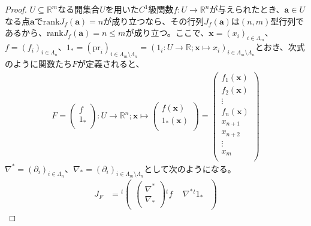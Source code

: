 \documentclass[dvipdfmx]{jsarticle}
\begin{document}
\begin{proof}
$U \subseteq \mathbb{R}^{m}$なる開集合$U$を用いた$C^{1}$級関数$f:U \rightarrow \mathbb{R}^{n}$が与えられたとき、$\mathbf{a} \in U$なる点$\mathbf{a}$で$\mathrm{rank}J_{f}\left( \mathbf{a} \right) = n$が成り立つなら、その行列$J_{f}\left( \mathbf{a} \right)$は$(n,m)$型行列であるから、$\mathrm{rank}J_{f}\left( \mathbf{a} \right) = n \leq m$が成り立つ。ここで、$\mathbf{x} = \left( x_{i} \right)_{i \in \varLambda_{m}}$、$f = \left( f_{i} \right)_{i \in \varLambda_{n}}$、$1_{*} = \left( \mathrm{pr}_{i} \right)_{i \in \varLambda_{m} \setminus \varLambda_{n} }= \left( 1_{i}:U \rightarrow \mathbb{R} ;\mathbf{x} \mapsto x_{i} \right)_{i \in \varLambda_{m} \setminus \varLambda_{n} }$とおき、次式のように関数たち$F$が定義されると、
\begin{align*}
F=\begin{pmatrix} f \\ 1_{*} \\ \end{pmatrix} :U \rightarrow \mathbb{R}^{n};\mathbf{x} \mapsto \begin{pmatrix}
f\left( \mathbf{x} \right) \\
1_{*} \left( \mathbf{x} \right) \\
\end{pmatrix} = \begin{pmatrix}
f_{1}\left( \mathbf{x} \right) \\
f_{2}\left( \mathbf{x} \right) \\
 \vdots \\
f_{n}\left( \mathbf{x} \right) \\
x_{n + 1} \\
x_{n + 2} \\
 \vdots \\
x_{m} \\
\end{pmatrix}
\end{align*}
$\nabla^{*} =\left( \partial_{i} \right)_{i\in \varLambda_{n} } $、$\nabla_{*} =\left( \partial_{i} \right)_{i\in \varLambda_{m} \setminus \varLambda_{n} } $として次のようになる。
\begin{align*}
J_{F} &= {}^{t} \begin{pmatrix}
 \begin{pmatrix}
  \nabla^{*} \\
  \nabla_{*} \\
 \end{pmatrix} {}^{t}f & \begin{matrix}
  \nabla^{*} {}^{t} 1_{*} \\

\end{matrix}
\end{pmatrix}
\end{align*}
\end{proof}
\end{document}
